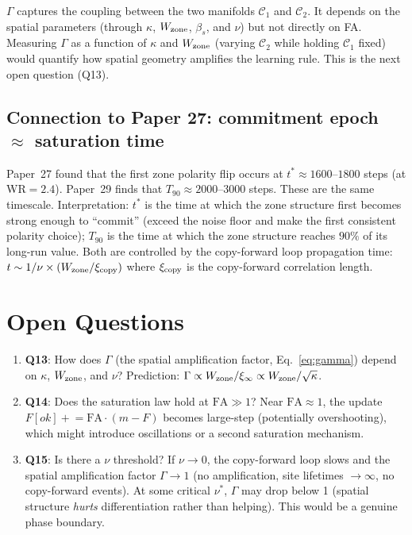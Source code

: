\documentclass[11pt,a4paper]{article}
\begin{document}
$\Gamma$ captures the coupling between the two manifolds $\mathcal{C}_1$ and
$\mathcal{C}_2$.  It depends on the spatial parameters (through $\kappa$,
$W_{\rm zone}$, $\beta_s$, and $\nu$) but not directly on FA.
Measuring $\Gamma$ as a function of $\kappa$ and $W_{\rm zone}$ (varying
$\mathcal{C}_2$ while holding $\mathcal{C}_1$ fixed) would quantify how
spatial geometry amplifies the learning rule.
This is the next open question (Q13).

\subsection{Connection to Paper 27: commitment epoch $\approx$ saturation time}

Paper~27 found that the first zone polarity flip occurs at
$t^*\approx1600$--$1800$ steps (at WR$=2.4$).
Paper~29 finds that $T_{90}\approx2000$--$3000$ steps.
These are the same timescale.
Interpretation: $t^*$ is the time at which the zone structure first becomes
strong enough to ``commit'' (exceed the noise floor and make the first
consistent polarity choice); $T_{90}$ is the time at which the zone structure
reaches $90\%$ of its long-run value.
Both are controlled by the copy-forward loop propagation time:
$t \sim 1/\nu \times (W_{\rm zone}/\xi_{\rm copy})$ where $\xi_{\rm copy}$
is the copy-forward correlation length.

\section{Open Questions}

\begin{enumerate}
  \item \textbf{Q13}: How does $\Gamma$ (the spatial amplification factor,
        Eq.~\eqref{eq:gamma}) depend on $\kappa$, $W_{\rm zone}$, and $\nu$?
        Prediction: $\Gamma\propto W_{\rm zone}/\xi_\infty \propto W_{\rm zone}/\sqrt{\kappa}$.
  \item \textbf{Q14}: Does the saturation law hold at $\mathrm{FA}\gg1$?
        Near $\mathrm{FA}\approx1$, the update $F[ok]\mathrel{+}=\mathrm{FA}\cdot(m-F)$
        becomes large-step (potentially overshooting), which might introduce
        oscillations or a second saturation mechanism.
  \item \textbf{Q15}: Is there a $\nu$ threshold?  If $\nu\to0$,
        the copy-forward loop slows and the spatial amplification factor
        $\Gamma\to1$ (no amplification, site lifetimes $\to\infty$,
        no copy-forward events). At some critical $\nu^*$, $\Gamma$
        may drop below 1 (spatial structure \emph{hurts} differentiation
        rather than helping). This would be a genuine phase boundary.
\end{enumerate}
\end{document}
